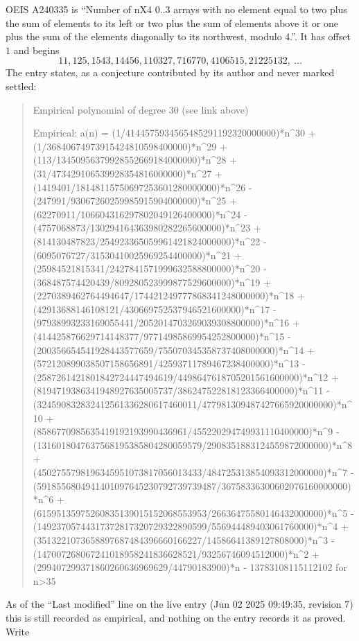 \documentclass[11pt,a4paper]{article}
\theoremstyle{plain}
\theoremstyle{definition}
\begin{document}
OEIS A240335 is ``Number of nX4 0..3 arrays with no element equal to two plus the sum of elements to its left or two plus the sum of elements above it or one plus the sum of the elements diagonally to its northwest, modulo 4.''. It has offset $1$ and begins
\[
11, 125, 1543, 14456, 110327, 716770, 4106515, 21225132,\ \dots
\]
The entry states, as a conjecture contributed by its author and never marked settled:
\begin{quote}
Empirical polynomial of degree 30 (see link above)

Empirical: a(n) = (1/4144575934565485291192320000000)*n\^{}30 + (1/36840674973915424810598400000)*n\^{}29 + (113/13450956379928552669184000000)*n\^{}28 + (31/473429106539928354816000000)*n\^{}27 + (1419401/18148115750697253601280000000)*n\^{}26 - (247991/93067260259985915904000000)*n\^{}25 + (62270911/106604316297802049126400000)*n\^{}24 - (4757068873/130294164363980282265600000)*n\^{}23 + (814130487823/254923365059961421824000000)*n\^{}22 - (6095076727/31530410025969254400000)*n\^{}21 + (25984521815341/2427841571999632588800000)*n\^{}20 - (368487574420439/809280523999877529600000)*n\^{}19 + (2270389462764494647/174421249777868341248000000)*n\^{}18 + (42913688146108121/430669752537946521600000)*n\^{}17 - (97938993233169055441/2052014703269039308800000)*n\^{}16 + (414425876629714148377/97714985869954252800000)*n\^{}15 - (200356654541928443577659/755070345358737408000000)*n\^{}14 + (572120899038507158656891/42593711789467238400000)*n\^{}13 - (2587261421801842724447494619/4498647618705201561600000)*n\^{}12 + (8194719386341948927635005737/386247522818123366400000)*n\^{}11 - (324590832832412561336280617460011/477981309487427665920000000)*n\^{}10 + (8586770985635419192193990436961/455220294749931110400000)*n\^{}9 - (1316018047637568195385804280059579/2908351883124559872000000)*n\^{}8 + (4502755798196345951073817056013433/484725313854093312000000)*n\^{}7 - (5918556804941401097645230792739739487/36758336300602076160000000)*n\^{}6 + (61595135975260835139015152068553953/26636475580146432000000)*n\^{}5 - (14923705744317372817320729322890599/556944489403061760000)*n\^{}4 + (3513221073658897687484396660166227/14586641389127808000)*n\^{}3 - (147007268067241018958241836628521/93256746094512000)*n\^{}2 + (299407299371860260636969629/44790183900)*n - 13783108115112102 for n>35
\end{quote}
As of the ``Last modified'' line on the live entry (Jun 02 2025 09:49:35, revision 7) this is still
recorded as empirical, and nothing on the entry records it as proved. Write
\end{document}
